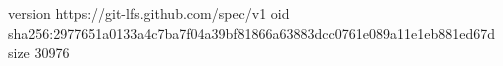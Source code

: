 version https://git-lfs.github.com/spec/v1
oid sha256:2977651a0133a4c7ba7f04a39bf81866a63883dcc0761e089a11e1eb881ed67d
size 30976
